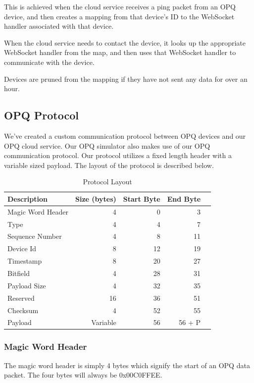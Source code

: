 \documentclass[11pt]{article}
\begin{document}
This is achieved when the cloud service receives a ping packet from an OPQ device, and then creates a mapping from that device's ID to the WebSocket handler associated with that device. 

When the cloud service needs to contact the device, it looks up the appropriate WebSocket handler from the map, and then uses that WebSocket handler to communicate with the device.

Devices are pruned from the mapping if they have not sent any data for over an hour. 

\subsection{OPQ Protocol}
We've created a custom communication protocol between OPQ devices and our OPQ cloud service. Our OPQ simulator also makes use of our OPQ communication protocol. Our protocol utilizes a fixed length header with a variable sized payload. The layout of the protocol is described below.

\begin{table}[htbp]
	\caption{Protocol Layout}
	\label{tab:protocol_layout}
	\begin{center}
		\begin{tabular}{|l|r|r|r|r|}
			\hline 
			\textbf{Description} & \textbf{Size (bytes)} & \textbf{Start Byte} & \textbf{End Byte}\\ 
			\hline 
			Magic Word Header & 4 & 0 & 3\\ 
			\hline 
			Type & 4 & 4 & 7\\ 
			\hline 
			Sequence Number & 4 & 8 & 11\\ 
			\hline 
			Device Id & 8 & 12 & 19\\ 
			\hline 
			Timestamp & 8 & 20 & 27\\ 
			\hline 
			Bitfield & 4 & 28 & 31\\ 
			\hline 
			Payload Size & 4 & 32 & 35\\ 
			\hline 
			Reserved & 16 & 36 & 51\\ 
			\hline 
			Checksum & 4 & 52 & 55\\ 
			\hline 
			Payload & Variable & 56 & 56 + P\\ 
			\hline 
		\end{tabular}
	\end{center}
\end{table} 

\subsubsection{Magic Word Header}
The magic word header is simply 4 bytes which signify the start of an OPQ data packet. The four bytes will always be 0x00C0FFEE.
\end{document}

